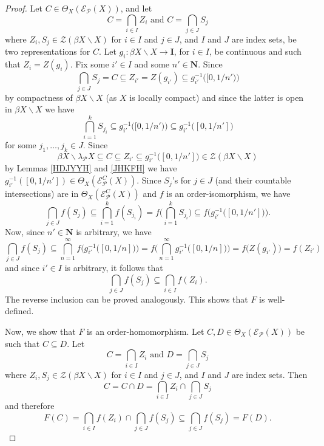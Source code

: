 \documentclass{amsart}
\theoremstyle{definition}
\theoremstyle{remark}
\theoremstyle{notation}
\numberwithin{equation}{section}
\begin{document}
\begin{proof}
Let $C\in \Theta_X({\mathscr E}_{{\mathcal P}}(X))$, and let
\[C=\bigcap_{i\in I}Z_i\mbox{ and }C=\bigcap_{j\in J}S_j\]
where $Z_i,S_j\in {\mathscr Z}(\beta X\backslash X)$ for $i\in I$ and  $j\in J$,  and $I$ and $J$ are index sets, be two representations for $C$. Let
$g_i:\beta X\backslash X\rightarrow\mathbf{I}$, for  $i\in I$, be continuous and such that $Z_i=Z(g_i)$. Fix some $i'\in I$ and some $n'\in \mathbf{N}$. Since
\[\bigcap_{j\in J}S_j=C\subseteq Z_{i'}=Z(g_{i'})\subseteq g_{i'}^{-1}\big([0,1/n')\big)\]
by compactness of $\beta X\backslash X$ (as $X$ is locally compact) and since the latter is open in $\beta X\backslash X$ we have
\[\bigcap_{i=1}^k S_{j_i}\subseteq g_{i'}^{-1}\big([0,1/n')\big)\subseteq g_{i'}^{-1}\big([0,1/n']\big)\]
for some $j_1,\ldots,j_k\in J$. Since
\[\beta X\backslash\lambda_{{\mathcal P}} X \subseteq C\subseteq Z_{i'}\subseteq g_{i'}^{-1}\big([0,1/n']\big)\in {\mathscr Z}(\beta X\backslash X)\]
by Lemmas \ref{HDJYYH} and \ref{JHKFH} we have $g_{i'}^{-1}([0,1/n'])\in\Theta_X({\mathscr E}^C_{{\mathcal P}}(X))$.
Since $S_j$'s for $j\in J$ (and their countable intersections) are in  $\Theta_X({\mathscr E}^C_{{\mathcal P}}(X))$ and $f$ is an  order-isomorphism, we have
\[\bigcap_{j\in J}f(S_j)\subseteq \bigcap_{i=1}^k f(S_{j_i})= f\Big(\bigcap_{i=1}^k S_{j_i}\Big)\subseteq f\big(g_{i'}^{-1}\big([0,1/n']\big)\big).\]
Now, since $n'\in \mathbf{N}$ is arbitrary, we have
\[\bigcap_{j\in J}f(S_j)\subseteq \bigcap_{n=1}^\infty f\big(g_{i'}^{-1}\big([0,1/n]\big)\big)=f\Big(\bigcap_{n=1}^\infty  g_{i'}^{-1}\big([0,1/n]\big)\Big)=f\big(Z( g_{i'})\big)=f(Z_{i'})\]
and since  $i'\in I$  is arbitrary, it follows that
\[\bigcap_{j\in J}f(S_j)\subseteq \bigcap_{i\in I}f(Z_i).\]
The reverse inclusion can be proved analogously. This shows that  $F$ is well-defined.

Now, we show that $F$ is an order-homomorphism. Let $C,D\in\Theta_X({\mathscr E}_{{\mathcal P}}(X))$ be such that $C\subseteq D$.
Let
\[C=\bigcap_{i\in I}Z_i\mbox{ and }D=\bigcap_{j\in J}S_j\]
where $Z_i,S_j\in {\mathscr Z}(\beta X\backslash X)$ for $i\in I$ and  $j\in J$,  and $I$ and $J$ are index sets. Then
\[C=C\cap D=\bigcap_{i\in I}Z_i\cap\bigcap_{j\in J}S_j\]
and therefore
\[F(C)=\bigcap_{i\in I}f(Z_i)\cap\bigcap_{j\in J}f(S_j)\subseteq\bigcap_{j\in J}f(S_j)=F(D).\]


\end{proof}
\end{document}
